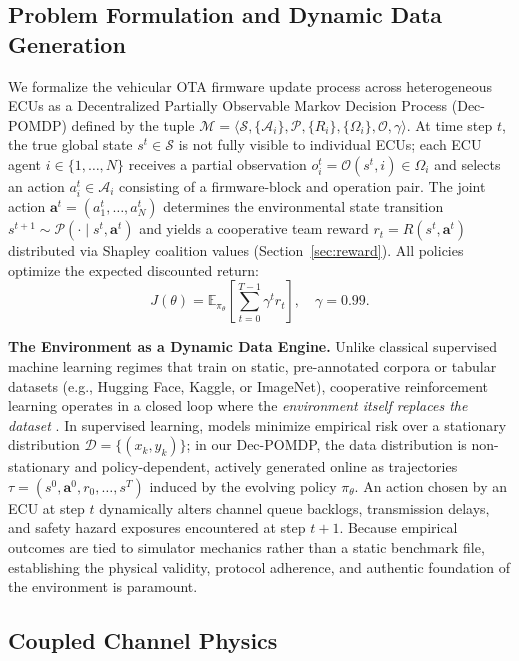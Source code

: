 \documentclass[conference]{IEEEtran}
\begin{document}
\subsection{Problem Formulation and Dynamic Data Generation}

We formalize the vehicular OTA firmware update process across heterogeneous ECUs as a
Decentralized Partially Observable Markov Decision Process (Dec-POMDP) defined by the
tuple $\mathcal{M} = \langle \mathcal{S}, \{\mathcal{A}_i\}, \mathcal{P}, \{R_i\}, \{\Omega_i\}, \mathcal{O}, \gamma \rangle$.
At time step $t$, the true global state $s^t \in \mathcal{S}$ is not fully visible to
individual ECUs; each ECU agent $i \in \{1,\ldots,N\}$ receives a partial observation
$o_i^t = \mathcal{O}(s^t, i) \in \Omega_i$ and selects an action
$a_i^t \in \mathcal{A}_i$ consisting of a firmware-block and operation pair. The joint
action $\mathbf{a}^t = (a_1^t, \ldots, a_N^t)$ determines the environmental state transition
$s^{t+1} \sim \mathcal{P}(\cdot \mid s^t, \mathbf{a}^t)$ and yields a cooperative team
reward $r_t = R(s^t, \mathbf{a}^t)$ distributed via Shapley coalition values
(Section~\ref{sec:reward}). All policies optimize the expected discounted return:
\[
  J(\theta) = \mathbb{E}_{\pi_\theta}\!\left[\sum_{t=0}^{T-1}\gamma^t r_t\right], \quad \gamma=0.99.
\]

\textbf{The Environment as a Dynamic Data Engine.}
Unlike classical supervised machine learning regimes that train on static, pre-annotated
corpora or tabular datasets (e.g., Hugging Face, Kaggle, or ImageNet), cooperative
reinforcement learning operates in a closed loop where the \textit{environment itself
replaces the dataset} \cite{sutton2018rl}. In supervised learning, models minimize empirical
risk over a stationary distribution $\mathcal{D} = \{(x_k, y_k)\}$; in our Dec-POMDP, the
data distribution is non-stationary and policy-dependent, actively generated online as
trajectories $\tau = (s^0, \mathbf{a}^0, r_0, \ldots, s^T)$ induced by the evolving policy
$\pi_\theta$. An action chosen by an ECU at step $t$ dynamically alters channel queue
backlogs, transmission delays, and safety hazard exposures encountered at step $t+1$.
Because empirical outcomes are tied to simulator mechanics rather than a static benchmark
file, establishing the physical validity, protocol adherence, and authentic foundation of the
environment is paramount.

\subsection{Coupled Channel Physics}
\label{sec:coupled}
\end{document}
